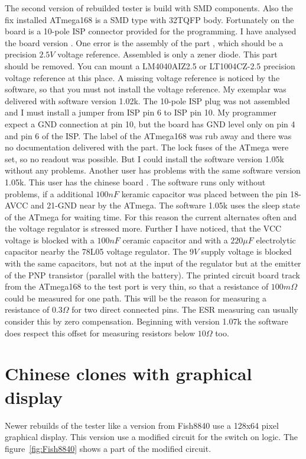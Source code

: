 The second version of rebuilded tester is build with SMD components. Also the fix installed ATmega168
is a SMD type with 32TQFP body.
Fortunately on the board is a 10-pole ISP connector provided for the programming.
I have analysed the board version . One error is the assembly of the part ,
which should be a precision \(2.5V\) voltage reference. Assembled is only a zener diode.
This part should be removed. You can mount a LM4040AIZ2.5 or LT1004CZ-2.5 precision voltage reference
at this place. A missing voltage reference is noticed by the software, so that you must not install
the voltage reference.
My exemplar was delivered with software version 1.02k. The 10-pole ISP plug was not assembled and I must
install a jumper from ISP pin 6 to ISP pin 10. My programmer expect a GND connection at pin 10, but the
board has GND level only on pin 4 and pin 6 of the ISP.
The label of the ATmega168 was rub away and there was no documentation delivered with the part.
The lock fuses of the ATmega were set, so no readout was possible.
But I could install the software version 1.05k without any problems.
Another user has problems with the same software version 1.05k. This user has the chinese board .
The software runs only without problems, if a additional \(100nF\) keramic capacitor was placed between
the pin 18-AVCC and 21-GND near by the ATmega.
The software 1.05k uses the sleep state of the ATmega for waiting time. For this reason the current alternates
often and the voltage regulator is stressed more.
Further I have noticed, that the VCC voltage is blocked with a \(100nF\) ceramic capacitor and with a
\(220\mu F\) electrolytic capacitor nearby the 78L05 voltage regulator.
The \(9V\) supply voltage is blocked with the same capacitors, but not at the input of the regulator but
at the emitter of the PNP transistor (parallel with the battery). 
The printed circuit board track from the ATmega168 to the test port is very thin, so that a resistance
of \(100m\Omega\) could be measured for one path. This will be the reason for measuring a resistance
of \(0.3\Omega\) for two direct connected pins.
The ESR measuring can usually consider this by zero compensation.
Beginning with version 1.07k  the software does respect this offset for measuring resistors below \(10\Omega\) too.

\section{Chinese clones with graphical display}
Newer rebuilds of the tester like a version from Fish8840  use a 128x64 pixel graphical display.
This version use a modified circuit for the switch on logic. 
The figure~\ref{fig:Fish8840} shows a part of the modified circuit.

